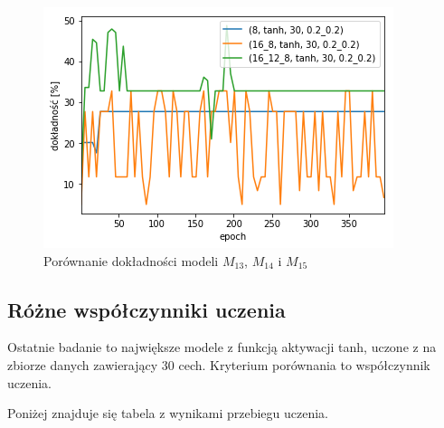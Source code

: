     \begin{figure}[htp]
        \centering
        \includegraphics[scale=0.8]{./img/arch-accuracy-tanh.png}
        \caption{Porównanie dokładności modeli $M_{13}$, $M_{14}$ i $M_{15}$}
    \end{figure}

    \subsection{Różne współczynniki uczenia}\label{subsec:różneWspólczynnikiUczenia2}

    Ostatnie badanie to największe modele z funkcją aktywacji tanh, uczone z na zbiorze danych zawierający 30 cech.
    Kryterium porównania to współczynnik uczenia.

    Poniżej znajduje się tabela z wynikami przebiegu uczenia.

